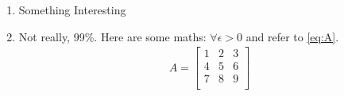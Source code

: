 \documentclass[a4paper]{article}
\begin{document}
\begin{enumerate}[label = (\alph*)]
	\item
		Something Interesting %
	\item
		Not really, 99\%.
		Here are some maths:
		$\forall\epsilon>0$ and refer to \eqref{eq:A}.
		\begin{align}\label{eq:A}
			A =
			\begin{bmatrix}
				1 & 2 & 3 \\
				4 & 5 & 6 \\
				7 & 8 & 9 \\
			\end{bmatrix}
			\tag{matrix}
		\end{align}
\end{enumerate}
\end{document}
